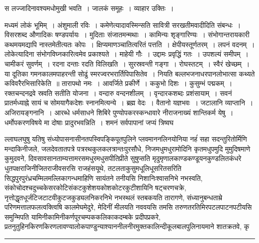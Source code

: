 \documentclass[11pt, openany]{book}
\begin{document}
\noindent
{\s स लज्जादिनावश्यमधोमुखी भवति~। जालकं समूहः~। व्याहार उक्तिः~।

मध्यमं लोकं भूमिम्~। अंशुमाली रविः~। कमेणेत्यादावस्मिन्सति सावित्री सरखतीमवादीदिति संबन्धः~। विसरशब्द औणादिकः षण्डपर्यायः~। मुदिताः संजातमन्मथाः~। कामिन्यः शृङ्गारिण्यः~। संभोगान्तरायकारी कथमयमद्यापि नास्तमेतीत्यतः कोपः~। क्षिप्यमाणञ्चातित्वरितं पत्तति~। क्षेपीयस्तूर्णतरम्~। लपनं वदनम्~। लोकेत्यादिना संभोगविघ्नकारित्वमेव प्रकाश्यते~। माहेयी गौः~। उद्दामः प्रवृद्धिं गतः~। उपशल्यं समीपम्~। चामीकरं सुवर्णम्~। रदना दन्ताः रदति विलिखति~। सुरस्रवन्ती गङ्गा~। रोघस्तटम्~। स्वैरं खेच्छम्~। {\qt या दूतिका गमनकालमपाहरन्ती सोढुं स्मरज्वरभरार्तिपिपासितेव~। नियति बल्लभजनाधरपानलोभात्सा कथ्यते कविवरैरभिसारिकेति~॥} तारापथो नमः~। आवर्जिते प्रकीर्णे~। ककुभो दिशः~। कुसुम्भं पद्मकम्~। रक्तचन्दनद्रवे स्रवति सतीति योजना~। वन्दारु वन्दनशीलम्~। वृन्दारकशब्दः प्रशंसायाम्~। सवनं प्रातर्मध्याह्ने सायं च सोमयागैकदेशः स्नानमित्यन्ये~। ब्रह्म वेदः~। वैतानो यज्ञभवः~। जटालानि व्याप्तानि~। अजिरायङ्गनानि~। आरब्धे धर्मसाधने शिबिरे पुण्योपकरस्कन्धावारे नीराजनाख्यं शान्तिकर्म येषु~। धर्मोपकरणविषये मा दोषाः प्रादुरभवन्निति~। {\qt शमनं सर्वपापानां जप्यं त्रिष्वघ\textendash }}

\newpage

\noindent
ल्लाघलघुषु यतिषु संध्योपासनासीनतपस्विपङ्किपूतपुलिने प्लवमाननलिनयोनिया नहंं सहा सदन्तुरितोर्मिणि मन्दाकिनीजले, जलदेवतातपत्रे पत्ररथकुलकलत्रान्तःपुरसौधे, निजमधुमधुरामोदिनि कृतमधुपमुदि मुमुदिषमाणे कुमुदवने, दिवसावसानताम्यत्तामरसमधुरमधुसपीतिप्रीते सुषुप्सति मृदुमृणालकाण्डकण्डूयनकुण्डलितकंधरे धुतपक्षराजिनीजितराजीवसरसि राजहंसयूथे, तटलताकुसुमधूलिधूसरितसरिति सिद्धपुरपुरंध्रचम्मिलमल्लिकागन्धमाहिणि सायंतने तनीयसि निशानिःश्वासनिभे नभस्वति, संकोचोदश्चदुच्चकेसरकोटिसंकटकुशेशयकोशकोटरकुटीशायिनि षट्चरणचक्रे, नृत्तोद्धृतधूर्जटिजटाटवीकुटजकुड्यलनिकरनिभे नभस्थलं स्तबकयति तारागणे, संध्यानुबन्धताम्रे परिणमत्तालफलत्वक्त्विषि कालमेघमेदुरे, मेदिनीं मीलयति नववयसि तमसि तरुणतरतिमिरपटलपाटनपटीयसि समुन्मिपति यामिनीकामिनीकर्णपूरचम्पककलिकाकदम्बके प्रदीपप्रकरे, प्रतनुतुहिनकिरणकिरणलावण्यालोकपाण्डुन्याश्याननीलनीरमुक्तकालिन्दीकूलबालपुलिनायमाने शातक्रतवे, कृ\textendash

\vspace{2mm}
\hrule
\end{document}
